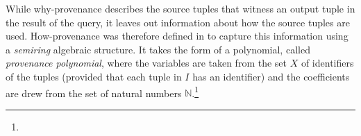 While why-provenance describes the source tuples that witness an output tuple in the result of the query, it leaves out  information about how the source tuples are used.
How-provenance was therefore defined in \citep{howProvenanceGreen} to capture this information using a \emph{semiring} algebraic structure.
It takes the form of a polynomial, called \emph{provenance polynomial}, where the variables are taken from the set $X$ of identifiers of the tuples (provided that each tuple in $I$ has an identifier) and the coefficients are drew from the set of natural numbers $\mathbb{N}$.\footnote{}

